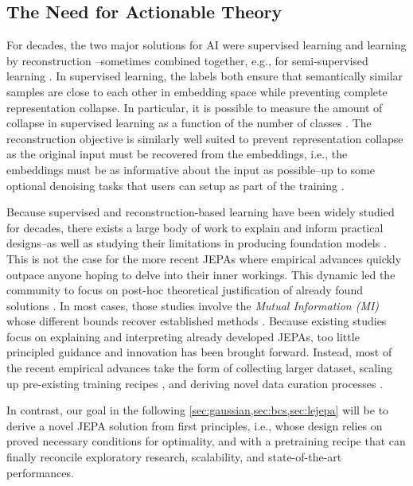 \subsection{The Need for Actionable Theory}
\label{sec:mi}


For decades, the two major solutions for AI were supervised learning \citep{lecun2015deep} and learning by reconstruction \citep{rumelhart1986learning}--sometimes combined together, e.g., for semi-supervised learning \citep{kingma2014semi}. In supervised learning, the labels both ensure that semantically similar samples are close to each other in embedding space while preventing complete representation collapse. In particular, it is possible to measure the amount of collapse in supervised learning as a function of the number of classes \citep{papyan2020prevalence}. The reconstruction objective is similarly well suited to prevent representation collapse as the original input must be recovered from the embeddings, i.e., the embeddings must be as informative about the input as possible--up to some optional denoising tasks that users can setup as part of the training \citep{vincent2010stacked}.


Because supervised and reconstruction-based learning have been widely studied for decades, there exists a large body of work to explain and inform practical designs--as well as studying their limitations in producing foundation models \citep{balestriero2024learning,van2025joint}. This is not the case for the more recent JEPAs where empirical advances quickly outpace anyone hoping to delve into their inner workings. This dynamic led the community to focus on post-hoc theoretical justification of already found solutions \citep{liu2021self,shwartz2024compress,shwartz2022we,zhang2023matrix}. In most cases, those studies involve the {\em Mutual Information (MI)} \citep{shannon1948mathematical,cover1999elements} whose different bounds recover established methods \citep{gutmann2010noise,ma2018noise,oord2018representation,poole2019variational,hjelm2018learning,mcallester2020formal}. Because existing studies focus on explaining and interpreting already developed JEPAs, too little principled guidance and innovation has been brought forward. Instead, most of the recent empirical advances take the form of collecting larger dataset, scaling up pre-existing training recipes \citep{goyal2019scaling,chen2020big,oquab2023dinov2,fan2025scaling}, and deriving novel data curation processes \citep{vo2024automatic,kerdreux2025efficient}. 

In contrast, our goal in the following \cref{sec:gaussian,sec:bcs,sec:lejepa} will be to derive a novel JEPA solution from first principles, i.e., whose design relies on proved necessary conditions for optimality, and with a pretraining recipe that can finally reconcile exploratory research, scalability, and state-of-the-art performances.








